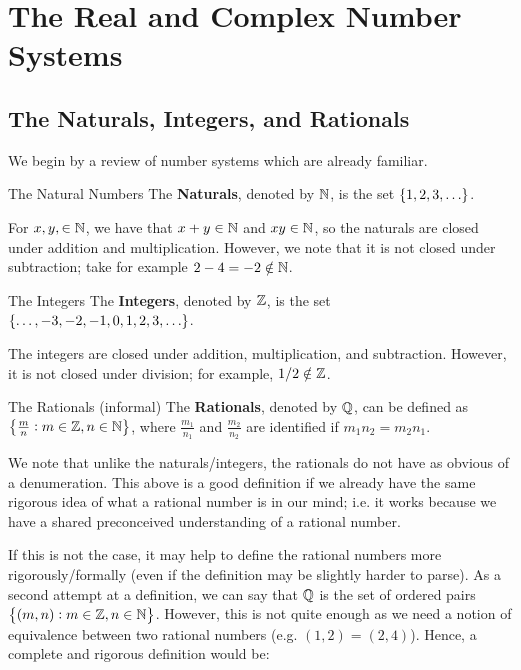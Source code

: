\section{The Real and Complex Number Systems}
\subsection{The Naturals, Integers, and Rationals}
We begin by a review of number systems which are already familiar.

\begin{ndef}{The Natural Numbers}
    The \textbf{Naturals}, denoted by $\mathbb{N}$, is the set $\set{1, 2, 3, \ldots}$.
\end{ndef}

For $x, y, \in \mathbb{N}$, we have that $x + y \in \mathbb{N}$ and $xy \in \mathbb{N}$, so the naturals are closed under addition and multiplication. However, we note that it is not closed under subtraction; take for example $2 - 4 = -2 \notin \mathbb{N}$.

\begin{ndef}{The Integers}
    The \textbf{Integers}, denoted by $\mathbb{Z}$, is the set $\set{\ldots, -3, -2, -1, 0, 1, 2, 3, \ldots}$.
\end{ndef}

The integers are closed under addition, multiplication, and subtraction. However, it is not closed under division; for example, $1/2 \notin \mathbb{Z}$. 

\begin{ndef}{The Rationals (informal)}
    The \textbf{Rationals}, denoted by $\mathbb{Q}$, can be defined as $\set{\frac{m}{n}: m \in \mathbb{Z}, n \in \mathbb{N}}$, where $\frac{m_1}{n_1}$ and $\frac{m_2}{n_2}$ are identified if $m_1n_2 = m_2n_1$.
\end{ndef}
We note that unlike the naturals/integers, the rationals do not have as obvious of a denumeration. This above is a good definition if we already have the same rigorous idea of what a rational number is in our mind; i.e. it works because we have a shared preconceived understanding of a rational number.

If this is not the case, it may help to define the rational numbers more rigorously/formally (even if the definition may be slightly harder to parse). As a second attempt at a definition, we can say that $\mathbb{Q}$ is the set of ordered pairs $\set{(m, n): m \in \mathbb{Z}, n \in \mathbb{N}}$. However, this is not quite enough as we need a notion of equivalence between two rational numbers (e.g. $(1, 2) = (2, 4)$). Hence, a complete and rigorous definition would be:

